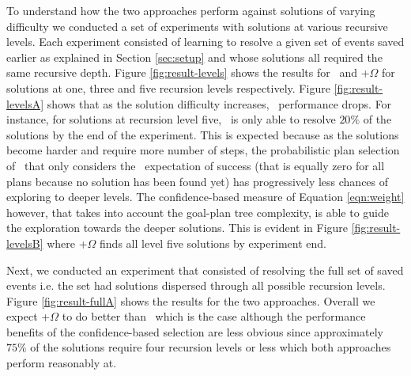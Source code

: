 \begin{figure*}[t]
\begin{center}
\subfigure[\CL]{\label{fig:result-levelsA}

}
\qquad
\subfigure[\CL+$\Omega$]{\label{fig:result-levelsB}

}
\caption{Agent performance under \CL\ and \CL+$\Omega$ schemes for solutions at recursion levels one (pluses), three (circles) and five (crosses). Each point represents results from $5$ experiment runs using an averaging window of $100$ samples.}
\label{fig:result-levels}
\end{center}
\end{figure*}

To understand how the two approaches perform against solutions of varying difficulty we conducted a set of experiments with solutions at various recursive levels. Each experiment consisted of learning to resolve a given set of  events saved earlier as explained in Section \ref{sec:setup} and whose solutions all required the same recursive depth. Figure \ref{fig:result-levels} shows the results for \CL\ and \CL+$\Omega$  for solutions at one, three and five recursion levels respectively. Figure \ref{fig:result-levelsA} shows that as the solution difficulty increases, \CL\ performance drops. For instance, for solutions at recursion level five, \CL\ is only able to resolve $20\%$ of the solutions by the end of the experiment. This is expected because as the solutions become harder and require more number of  steps, the probabilistic plan selection of \CL\ that only considers the \dt\ expectation of success (that is equally zero for all plans because no solution has been found yet) has progressively less chances of exploring to deeper levels. The confidence-based measure of Equation \ref{eqn:weight} however, that takes into account the goal-plan tree complexity, is able to guide the exploration towards the deeper solutions. This is evident in Figure \ref{fig:result-levelsB} where \CL+$\Omega$ finds all level five solutions by experiment end.

Next, we conducted an experiment that consisted of resolving the full set of saved  events i.e. the set had solutions dispersed through all possible recursion levels. Figure \ref{fig:result-fullA} shows the results for the two approaches. Overall we expect \CL+$\Omega$ to do better than \CL\ which is the case although the performance benefits of the confidence-based selection are less obvious since approximately $75\%$ of the solutions require four recursion levels or less which both approaches perform reasonably at. 

